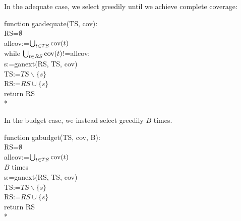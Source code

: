 In the adequate case, we select greedily until we achieve complete
coverage:

function gaadequate(TS, cov): \\
	RS=$\emptyset$ \\
	allcov:=$\bigcup_{t \in TS} \hbox{cov}(t)$ \\
	while $\bigcup_{t \in RS} \hbox{cov}(t)$!=allcov: \\
		s:=ganext(RS, TS, cov) \\
		TS:=$TS \backslash \{s\}$ \\
		RS:=$RS \cup \{s\}$ \\
	return RS \\*

In the budget case, we instead select greedily $B$ times.

function gabudget(TS, cov, B): \\
	RS=$\emptyset$ \\
	allcov:=$\bigcup_{t \in TS} \hbox{cov}(t)$ \\
	$B$ times \\
		s:=ganext(RS, TS, cov) \\
		TS:=$TS \backslash \{s\}$ \\
		RS:=$RS \cup \{s\}$ \\
	return RS \\*

